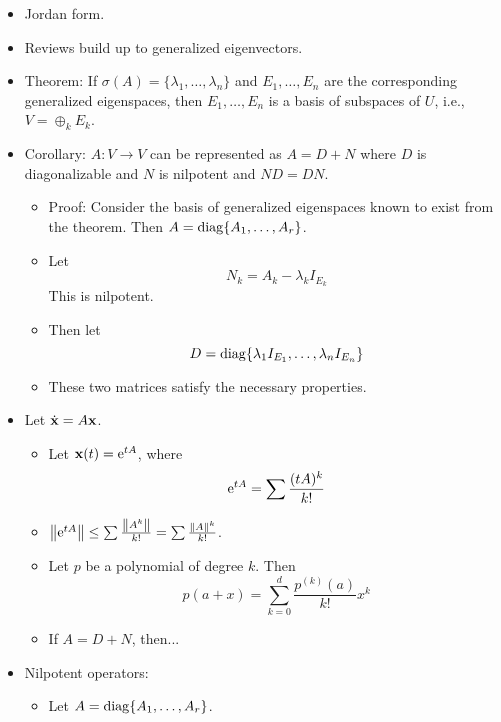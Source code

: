 \documentclass[../../notes.tex]{subfiles}
\begin{document}
\begin{itemize}
    \item {}Jordan form.
    \item Reviews build up to generalized eigenvectors.
    \item Theorem: If $\sigma(A)=\{\lambda_1,\dots,\lambda_n\}$ and $E_1,\dots,E_n$ are the corresponding generalized eigenspaces, then $E_1,\dots,E_n$ is a basis of subspaces of $U$, i.e., $V=\oplus_kE_k$.
    \item Corollary: $A:V\to V$ can be represented as $A=D+N$ where $D$ is diagonalizable and $N$ is nilpotent and $ND=DN$.
    \begin{itemize}
        \item Proof: Consider the basis of generalized eigenspaces known to exist from the theorem. Then $A=\diag\{A_1,\dots,A_r\}$.
        \item Let
        \begin{equation*}
            N_k = A_k-\lambda_kI_{E_k}
        \end{equation*}
        This is nilpotent.
        \item Then let
        \begin{equation*}
            D = \diag\{\lambda_1I_{E_1},\dots,\lambda_nI_{E_n}\}
        \end{equation*}
        \item These two matrices satisfy the necessary properties.
    \end{itemize}
    \item Let $\dot{\x}=A\x$.
    \begin{itemize}
        \item Let $\x(t)=\e[tA]$, where
        \begin{equation*}
            \e[tA] = \sum\frac{(tA)^k}{k!}
        \end{equation*}
        \item $\norm{\e[tA]}\leq\sum\frac{\norm{A^k}}{k!}=\sum\frac{\norm{A}^k}{k!}$.
        \item Let $p$ be a polynomial of degree $k$. Then
        \begin{equation*}
            p(a+x) = \sum_{k=0}^d\frac{p^{(k)}(a)}{k!}x^k
        \end{equation*}
        \item If $A=D+N$, then...
    \end{itemize}
    \item Nilpotent operators:
    \begin{itemize}
        \item Let $A=\diag\{A_1,\dots,A_r\}$.

\end{itemize}
\end{itemize}
\end{document}
